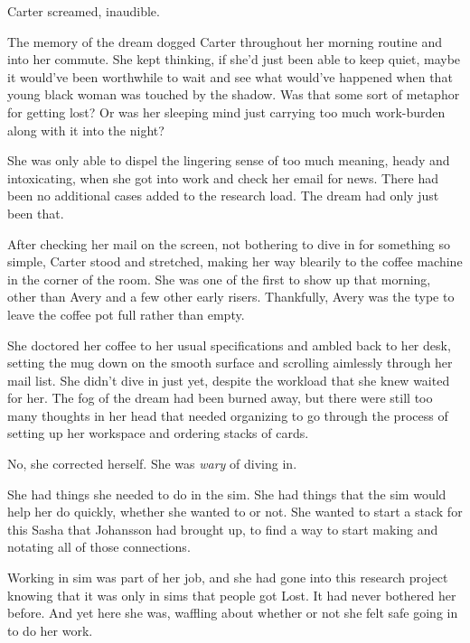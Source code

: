 Carter screamed, inaudible.

\secdiv

The memory of the dream dogged Carter throughout her morning routine and into her commute.  She kept thinking, if she'd just been able to keep quiet, maybe it would've been worthwhile to wait and see what would've happened when that young black woman was touched by the shadow.  Was that some sort of metaphor for getting lost?  Or was her sleeping mind just carrying too much work-burden along with it into the night?

She was only able to dispel the lingering sense of too much meaning, heady and intoxicating, when she got into work and check her email for news.  There had been no additional cases added to the research load.  The dream had only just been that.

After checking her mail on the screen, not bothering to dive in for something so simple, Carter stood and stretched, making her way blearily to the coffee machine in the corner of the room.  She was one of the first to show up that morning, other than Avery and a few other early risers.  Thankfully, Avery was the type to leave the coffee pot full rather than empty.

She doctored her coffee to her usual specifications and ambled back to her desk, setting the mug down on the smooth surface and scrolling aimlessly through her mail list.  She didn't dive in just yet, despite the workload that she knew waited for her.  The fog of the dream had been burned away, but there were still too many thoughts in her head that needed organizing to go through the process of setting up her workspace and ordering stacks of cards.

No, she corrected herself.  She was \textit{wary} of diving in.

She had things she needed to do in the sim.  She had things that the sim would help her do quickly, whether she wanted to or not.  She wanted to start a stack for this Sasha that Johansson had brought up, to find a way to start making and notating all of those connections.

Working in sim was part of her job, and she had gone into this research project knowing that it was only in sims that people got Lost.  It had never bothered her before.  And yet here she was, waffling about whether or not she felt safe going in to do her work.
